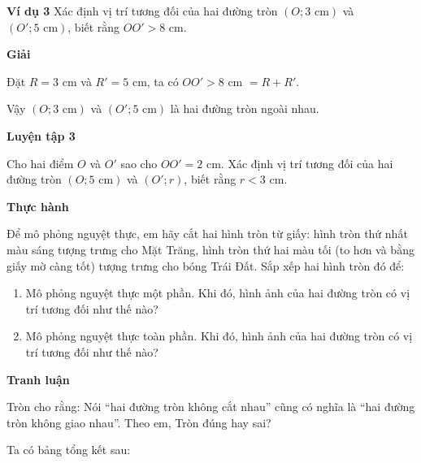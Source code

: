 \begin{lesson}
    \textbf{Ví dụ 3} Xác định vị trí tương đối của hai đường tròn $(O;3\text{ cm})$ và $(O';5\text{ cm})$, biết rằng $OO'>8$ cm.

    \textbf{Giải}

    Đặt $R=3$ cm và $R'=5$ cm, ta có $OO'>8$ cm $=R+R'$.

    Vậy $(O;3\text{ cm})$ và $(O';5\text{ cm})$ là hai đường tròn ngoài nhau.

    \textbf{Luyện tập 3}

    Cho hai điểm $O$ và $O'$ sao cho $OO'=2$ cm. Xác định vị trí tương đối của hai đường tròn $(O;5\text{ cm})$ và $(O';r)$, biết rằng $r<3$ cm.

    \answerline
    \answerline

    \textbf{Thực hành}

    Để mô phỏng nguyệt thực, em hãy cắt hai hình tròn từ giấy: hình tròn thứ nhất màu sáng tượng trưng cho Mặt Trăng, hình tròn thứ hai màu tối (to hơn và bằng giấy mờ càng tốt) tượng trưng cho bóng Trái Đất. Sắp xếp hai hình tròn đó để:
    \begin{enumerate}[label=\alph*)]
        \item Mô phỏng nguyệt thực một phần. Khi đó, hình ảnh của hai đường tròn có vị trí tương đối như thế nào?

        \answerline
        \item Mô phỏng nguyệt thực toàn phần. Khi đó, hình ảnh của hai đường tròn có vị trí tương đối như thế nào?

        \answerline
    \end{enumerate}

    \textbf{Tranh luận}

    Tròn cho rằng: Nói ``hai đường tròn không cắt nhau'' cũng có nghĩa là ``hai đường tròn không giao nhau''. Theo em, Tròn đúng hay sai?

    \answerline
    \answerline

    Ta có bảng tổng kết sau:


\end{lesson}
